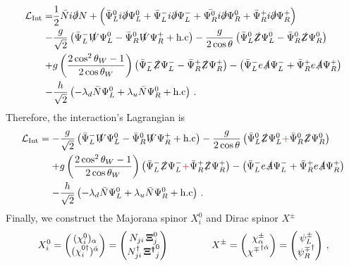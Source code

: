 %
\begin{align}
\label{eq:lint2}
\mathcal{L_{\text{Int}}} =& \dfrac{1}{2}\bar{N}i\slashed{\partial}N 
+\left(\bar{\Psi}_L^0i\slashed{\partial}\Psi_L^0+\bar{\Psi}_L^-i\slashed{\partial}\Psi_L^-+\bar{{\Psi}_R^0}i\slashed{\partial}
\Psi_R^0+\bar{\Psi}_R^+i\slashed{\partial}\Psi_R^+\right)\nonumber\\
-&\dfrac{g}{\sqrt{2}}\left(\bar{\Psi}_L^-\slashed{W}\Psi_L^0-\bar{\Psi}_R^0\slashed{W}\Psi_R^++\text{h.c}\right)
- \dfrac{g}{2\cos\theta}\left(\bar{\Psi}_L^0\slashed{Z}\Psi_L^0-\bar{\Psi}_R^0\slashed{Z}\Psi_R^0\right) \nonumber\\
+& g\left(\dfrac{2\cos^2\theta_W-1}{2\cos\theta_W}\right)\left(\bar{\Psi}_L^-\slashed{Z}\Psi_L^--\bar{\Psi}_R^+\slashed{Z}\Psi_R^+\right)
-\left(\bar{\Psi}_L^-e\slashed{A}\Psi_L^-+\bar{\Psi}_R^+e\slashed{A}\Psi_R^+\right)
\nonumber\\
-& \dfrac{h}{\sqrt{2}}\left(-\lambda_d\bar{N}\Psi_L^0 + \lambda_u\bar{N}\Psi_R^0+\text{h.c}\right)\,.
\end{align}
Therefore, the interaction's Lagrangian is
\begin{align}
\label{eq:lint3}
\mathcal{L}_{\text{Int}} 
=-&\dfrac{g}{\sqrt{2}}\left(\bar{\Psi}_L^-\slashed{W}\Psi_L^0-\bar{\Psi}_R^0\slashed{W}\Psi_R^++\text{h.c}\right)
- \dfrac{g}{2\cos\theta}\left(\bar{\Psi}_L^0\slashed{Z}\Psi_L^0{\color{red}+}\bar{\Psi}_R^0\slashed{Z}\Psi_R^0\right) \nonumber\\
+& g\left(\dfrac{2\cos^2\theta_W-1}{2\cos\theta_W}\right)\left(\bar{\Psi}_L^-\slashed{Z}\Psi_L^-{\color{red}+}\bar{\Psi}_R^+\slashed{Z}\Psi_R^+\right)
-\left(\bar{\Psi}_L^-e\slashed{A}\Psi_L^-+\bar{\Psi}_R^+e\slashed{A}\Psi_R^+\right)
\nonumber\\
-& \dfrac{h}{\sqrt{2}}\left(-\lambda_d\bar{N}\Psi_L^0 + \lambda_u\bar{N}\Psi_R^0+\text{h.c}\right)\,.
\end{align}
%
Finally, we construct the Majorana spinor $X_i^0$ and Dirac spinor $X^{\pm}$  
\begin{align}
X_i^0=\begin{pmatrix}
(\chi_{i}^0)_\alpha \\ (\chi_i^{0\dagger})^{\dot{\alpha}}
\end{pmatrix}
=\begin{pmatrix}
N_{ji}\,\boldsymbol{\Xi}^{0}_j \\
N_{ji}^{\dagger}\,\boldsymbol{{\Xi}^{\dagger}}^{0}_j
\end{pmatrix}
\hspace{1.5 cm}
X^{\pm}=\begin{pmatrix}
\chi^{\pm}_{\alpha} \\ {\chi^{\mp}}^{\dagger\dot{\alpha}}
\end{pmatrix}
=\begin{pmatrix}
\psi_L^{\pm} \\
{\psi_R^{\mp}}^{\dagger}
\end{pmatrix}\,,
\end{align}
